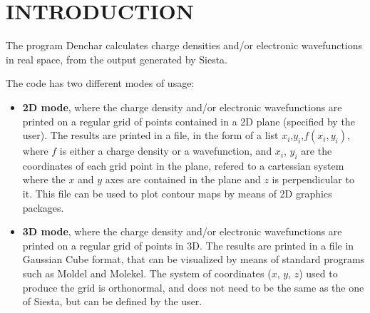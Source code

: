 
\tableofcontents

\newpage



\section{INTRODUCTION}

The program {\sc Denchar} calculates charge densities and/or electronic 
wavefunctions in real space, from the output generated by {\sc Siesta}.

The code has two different modes of usage:

\begin{itemize}

\item{\bf 2D mode}, where the charge density and/or electronic
wavefunctions are printed on a regular grid of points contained
in a 2D plane (specified by the user). 
The results are printed in a file, in the form
of a list $x_i$,$y_i$,$f(x_i,y_i)$, where $f$ is either a
charge density or a wavefunction, and $x_i$, $y_i$ are the coordinates
of each grid point in the plane, refered to a cartessian system
where the $x$ and $y$ axes are contained in the plane and $z$ is
perpendicular to it.
This file can be used to plot contour maps by means of
2D graphics packages.

\item{\bf 3D mode}, where the charge density and/or electronic
wavefunctions are printed on a regular grid of points in 3D.
The results are printed in a file in Gaussian Cube
format, that can be visualized by means of standard programs
such as {\sc Moldel} and {\sc Molekel}. The system of coordinates
($x$, $y$, $z$) used to produce the grid is orthonormal, and 
does not need to be the same as the one of {\sc Siesta}, but
can be defined by the user.

\end{itemize}

